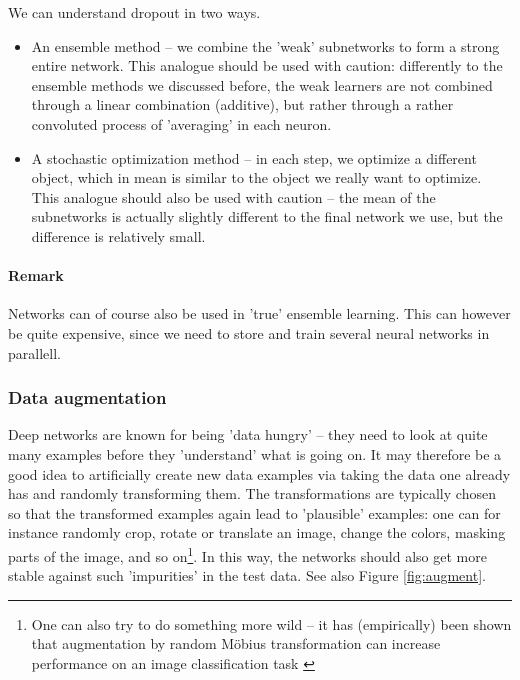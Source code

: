 \documentclass{article}
\begin{document}
We can understand dropout in two ways.
\begin{itemize}
    \item An ensemble method -- we combine the 'weak' subnetworks to form a strong entire network. This analogue should be used with caution: differently to the ensemble methods we discussed before, the weak learners are not combined through a linear combination (additive), but rather through a rather convoluted process of 'averaging' in each neuron.
    \item A stochastic optimization method -- in each step, we optimize a different object, which in mean is similar to the object we really want to optimize. This analogue should also be used with caution -- the mean of the subnetworks is actually slightly different to the final network we use, but the difference is relatively small.
\end{itemize}
\paragraph{Remark} Networks can of course also be used in 'true' ensemble learning. This can however be quite expensive, since we need to store and train several neural networks in parallell.

\subsubsection{Data augmentation} Deep networks are known for being 'data hungry' -- they need to look at quite many examples before they 'understand' what is going on. It may therefore be a good idea to artificially create new data examples via taking the data one already has and randomly transforming them. The transformations are typically chosen so that the transformed examples again lead to 'plausible' examples: one can for instance randomly crop, rotate or translate an image, change the colors, masking parts of the image, and so on\footnote{One can also try to do something more wild -- it has (empirically) been shown that augmentation by random Möbius transformation can increase performance on an image classification task \cite{zhou2021data}}. In this way, the networks should also get more stable against such 'impurities' in the test data. See also Figure \ref{fig:augment}.
\end{document}
